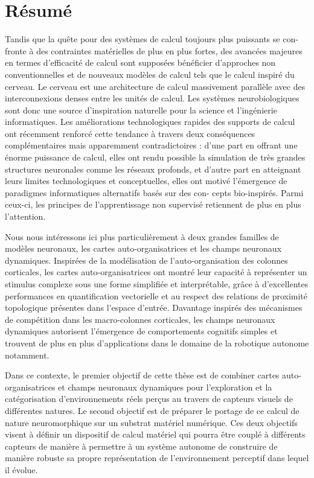 \chapter*{Résumé}
\markboth{}{}

Tandis que la quête pour des systèmes de calcul toujours plus puissants se con- fronte à des contraintes matérielles de plus en plus fortes, des avancées majeures en termes d’efficacité de calcul sont supposées bénéficier d’approches non conventionnelles et de nouveaux modèles de calcul tels que le calcul inspiré du cerveau. Le cerveau est une architecture de calcul massivement parallèle avec des interconnexions denses entre les unités de calcul. Les systèmes neurobiologiques sont donc une source d'inspiration naturelle pour la science et l'ingénierie informatiques. Les améliorations technologiques rapides des supports de calcul ont récemment renforcé cette tendance à travers deux conséquences complémentaires mais apparemment contradictoires : d’une part en offrant une énorme puissance de calcul, elles ont rendu possible la simulation de très grandes structures neuronales comme les réseaux profonds, et d’autre part en atteignant leurs limites technologiques et conceptuelles, elles ont motivé l'émergence de paradigmes informatiques alternatifs basés sur des con- cepts bio-inspirés. Parmi ceux-ci, les principes de l’apprentissage non supervisé retiennent de plus en plus l’attention. 

Nous nous intéressons ici plus particulièrement à deux grandes familles de modèles neuronaux, les cartes auto-organisatrices et les champs neuronaux dynamiques. Inspirées de la modélisation de l’auto-organisation des colonnes corticales, les cartes auto-organisatrices ont montré leur capacité à représenter un stimulus complexe sous une forme simplifiée et interprétable, grâce à d’excellentes performances en quantification vectorielle et au respect des relations de proximité topologique présentes dans l’espace d’entrée. Davantage inspirés des mécanismes de compétition dans les macro-colonnes corticales, les champs neuronaux dynamiques autorisent l’émergence de comportements cognitifs simples et trouvent de plus en plus d’applications dans le domaine de la robotique autonome notamment.

Dans ce contexte, le premier objectif de cette thèse est de combiner cartes auto-organisatrices et champs neuronaux dynamiques pour l’exploration et la catégorisation d’environnements réels perçus au travers de capteurs visuels de différentes natures. Le second objectif est de préparer le portage de ce calcul de nature neuromorphique sur un substrat matériel numérique. Ces deux objectifs visent à définir un dispositif de calcul matériel qui pourra être couplé à différents capteurs de manière à permettre à un système autonome de construire de manière robuste sa propre représentation de l’environnement perceptif dans lequel il évolue.

